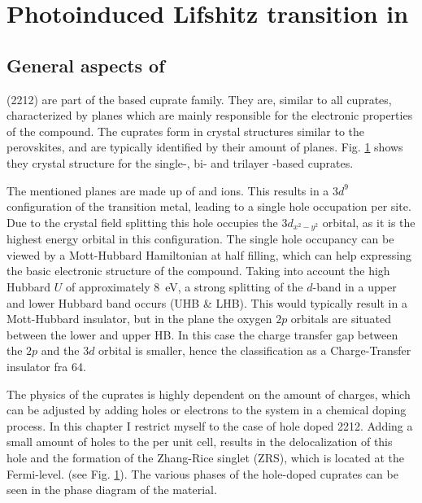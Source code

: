 \chapter{Photoinduced Lifshitz transition in }



\section{General aspects of }
\label{sec:bscco_general}

 (2212) are part of the  based cuprate family.
They are, similar to all cuprates, characterized by  planes which are mainly responsible for the electronic properties of the compound.
The cuprates form in crystal structures similar to the perovskites, and are typically identified by their amount of  planes.
Fig. \ref{} shows they crystal structure for the single-, bi- and trilayer -based cuprates.

The mentioned  planes are made up of  and  ions.
This results in a $3d^9$ configuration of the transition metal, leading to a single hole occupation per site.
Due to the crystal field splitting this hole occupies the $3d_{x^2-y^2}$ orbital, as it is the highest energy orbital in this configuration.
The single hole occupancy can be viewed by a Mott-Hubbard Hamiltonian at half filling, which can help expressing the basic electronic structure of the compound.
Taking into account the high Hubbard $U$ of approximately \qty{8}{\electronvolt}, a strong splitting of the $d$-band in a upper and lower Hubbard band occurs (UHB \& LHB).
This would typically result in a Mott-Hubbard insulator, but in the  plane the oxygen $2p$ orbitals are situated between the lower and upper HB.
In this case the charge transfer gap between the  $2p$ and the  $3d$ orbital is smaller, hence the classification as a Charge-Transfer insulator \cite{} fra 64. 

The physics of the cuprates is highly dependent on the amount of charges, which can be adjusted by adding holes or electrons to the system in a chemical doping process.
In this chapter I restrict myself to the case of hole doped 2212.
Adding a small amount of holes to the per unit cell, results in the delocalization of this hole and the formation of the Zhang-Rice singlet (ZRS), which is located at the Fermi-level. (see Fig. \ref{}).
The various phases of the hole-doped cuprates can be seen in the phase diagram of the material.

